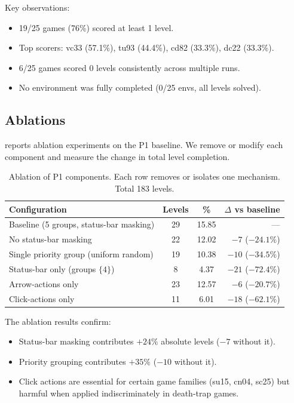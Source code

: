 \documentclass[10pt,letterpaper]{article}
\begin{document}
Key observations:
\begin{itemize}
    \item 19/25 games (76\%) scored at least 1 level.
    \item Top scorers: vc33 (57.1\%), tu93 (44.4\%), cd82 (33.3\%), dc22 (33.3\%).
    \item 6/25 games scored 0 levels consistently across multiple runs.
    \item No environment was fully completed (0/25 envs, all levels solved).
\end{itemize}

\subsection{Ablations}\label{sec:exp-ablations}

 reports ablation experiments on the P1 baseline.
We remove or modify each component and measure the change in total level completion.

\begin{table}[h]
\centering
\small
\begin{tabular}{lccr}
\toprule
Configuration & Levels & \% & $\Delta$ vs baseline \\
\midrule
Baseline (5 groups, status-bar masking) & 29 & 15.85 & --- \\
No status-bar masking & 22 & 12.02 & $-7$ ($-24.1\%$) \\
Single priority group (uniform random) & 19 & 10.38 & $-10$ ($-34.5\%$) \\
Status-bar only (groups $\{4\}$) & 8 & 4.37 & $-21$ ($-72.4\%$) \\
Arrow-actions only & 23 & 12.57 & $-6$ ($-20.7\%$) \\
Click-actions only & 11 & 6.01 & $-18$ ($-62.1\%$) \\
\bottomrule
\end{tabular}
\caption{Ablation of P1 components. Each row removes or isolates one mechanism. Total 183 levels.}
\label{tab:ablations}
\end{table}

The ablation results confirm:
\begin{itemize}
    \item Status-bar masking contributes $+24\%$ absolute levels ($-7$ without it).
    \item Priority grouping contributes $+35\%$ ($-10$ without it).
    \item Click actions are essential for certain game families (su15, cn04, sc25) but harmful when applied indiscriminately in death-trap games.
\end{itemize}
\end{document}
